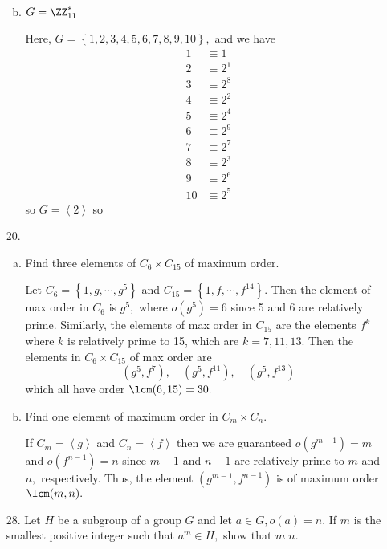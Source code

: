 \documentclass{article}
\begin{document}
\begin{itemize}
\begin{enumerate}[(a)]
\begin{soln}
				\end{soln}

			\item $G=\ZZ_{11}^*$
				\begin{soln}
					Here, $G=\left\{ 1, 2, 3, 4, 5, 6, 7, 8, 9, 10 \right\},$ and we have
					\begin{align*}
						1 &\equiv 1 \\
						2 &\equiv 2^1 \\
						3 &\equiv 2^8 \\
						4 &\equiv 2^2 \\
						5 &\equiv 2^4 \\
						6 &\equiv 2^9 \\
						7 &\equiv 2^7 \\
						8 &\equiv 2^3 \\
						9 &\equiv 2^6 \\
						10 &\equiv 2^5
					\end{align*} so $G=\left< 2\right>$ so 

				\end{soln}
				
		\end{enumerate}

	\item[20.] \begin{enumerate}[(a)]
			\item Find three elements of $C_6\times C_{15}$ of maximum order.
				\begin{soln}
					Let $C_6=\left\{ 1, g, \cdots, g^5 \right\}$ and $C_{15}=\left\{ 1, f, \cdots, f^{14} \right\}.$ Then the element of max order in $C_6$ is $g^5,$ where $o(g^5)=6$ since 5 and 6 are relatively prime. Similarly, the elements of max order in $C_{15}$ are the elements $f^k$ where $k$ is relatively prime to 15, which are $k=7, 11, 13.$ Then the elements in $C_6\times C_{15}$ of max order are \[\boxed{(g^5, f^7), \quad (g^5, f^{11}), \quad (g^5, f^{13})}\] which all have order $\lcm(6, 15)=30.$
					
				\end{soln}

			\item Find one element of maximum order in $C_m\times C_n.$
				\begin{soln}
					If $C_m=\left< g\right>$ and $C_n=\left< f\right>$ then we are guaranteed $o(g^{m-1})=m$ and $o(f^{n-1})=n$ since $m-1$ and $n-1$ are relatively prime to $m$ and $n,$ respectively. Thus, the element $\boxed{(g^{m-1}, f^{n-1})}$ is of maximum order $\lcm(m, n).$
					
				\end{soln}
				
		\end{enumerate}

	\item[28.] Let $H$ be a subgroup of a group $G$ and let $a\in G, o(a)=n.$ If $m$ is the smallest positive integer such that $a^m\in H,$ show that $m|n.$
		
\end{itemize}
\end{document}
